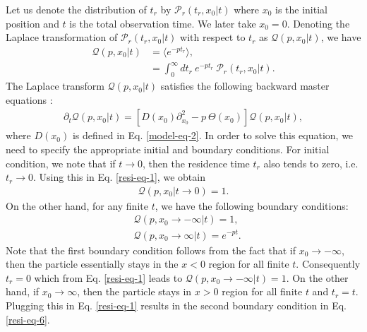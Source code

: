 \documentclass[showpacs,amsmath,amssymb,aps,pre,twocolumn,]{revtex4-1}
\def\bluew#1{{\color{black} #1}}
\begin{document}
Let us denote the distribution of $t_r$ by $\mathcal{P}_r(t_r, x_0|t)$ where $x_0$ is the initial position and $t$ is the total observation time. We later take $x_0 = 0$. Denoting the Laplace transformation of $\mathcal{P}_r(t_r, x_0|t)$ with respect to $t_r$ as $\mathcal{Q}(p,x_0|t)$, we have 
\begin{align}
\mathcal{Q}(p,x_0|t) &= \langle e^{-p t_r} \rangle , \label{resi-eq-1} \\
&= \int _{0}^{\infty} dt_r ~e^{-p t_r}~ \mathcal{P}_r(t_r, x_0|t).
\label{resi-eq-2}
\end{align}
The Laplace transform $\mathcal{Q}(p,x_0|t)$ satisfies the following backward master equations \bluew{\cite{Majumdar005}}:
\begin{align}
\partial _t \mathcal{Q}(p,x_0|t) = \left[D(x_0) \partial _{x_0}^2-p~ \Theta (x_0) \right]\mathcal{Q}(p,x_0|t),
\label{resi-eq-3}
\end{align}
where $D(x_0)$ is defined in Eq. \eqref{model-eq-2}. In order to solve this equation, we need to specify the appropriate initial and boundary conditions. For initial condition, we note that if $t \to 0$, then the residence time $t_r$ also tends to zero, i.e. $t_r \to 0$. Using this in Eq. \eqref{resi-eq-1}, we obtain
\begin{align}
\mathcal{Q}(p,x_0|t \to 0) = 1.
\label{resi-eq-4}
\end{align}
On the other hand, for any finite $t$, we have the following boundary conditions:
\begin{align}
& \mathcal{Q}(p,x_0 \to -\infty |t) = 1, \label{resi-eq-5} \\
& \mathcal{Q}(p,x_0 \to \infty |t) = e^{-pt}. \label{resi-eq-6}
\end{align}
Note that the first boundary condition follows from the fact that if $x_0 \to -\infty$, then the particle essentially stays in the $x<0$ region for all finite $t$. Consequently $t_r = 0$ which from Eq. \eqref{resi-eq-1} leads to $\mathcal{Q}(p,x_0 \to -\infty |t) = 1$. On the other hand, if $x_0 \to \infty$, then the particle stays in $x >0$ region for all finite $t$ and $t_r =t$. Plugging this in Eq. \eqref{resi-eq-1} results in the second boundary condition in Eq. \eqref{resi-eq-6}.
\end{document}
